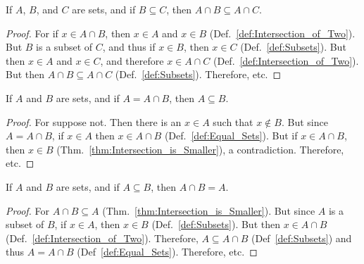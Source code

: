 \documentclass[crop=false,class=book,oneside]{standalone}
\begin{document}
            \begin{theorem}
                \label{thm:Intersection_with_Lesser_Set}%
                If $A$, $B$, and $C$ are sets, and if
                $B\subseteq{C}$, then
                $A\cap{B}\subseteq{A}\cap{C}$.
            \end{theorem}
            \begin{proof}
                For if $x\in{A}\cap{B}$, then $x\in{A}$ and
                $x\in{B}$ (Def.~\ref{def:Intersection_of_Two}).
                But $B$ is a subset of $C$, and thus if
                $x\in{B}$, then $x\in{C}$
                (Def.~\ref{def:Subsets}). But then $x\in{A}$ and
                $x\in{C}$, and therefore $x\in{A}\cap{C}$
                (Def.~\ref{def:Intersection_of_Two}). But
                then $A\cap{B}\subseteq{A}\cap{C}$
                (Def.~\ref{def:Subsets}). Therefore, etc.
            \end{proof}
            \begin{theorem}
                \label{thm:Intersection_is_Equal}%
                If $A$ and $B$ are sets, and if
                $A=A\cap{B}$, then $A\subseteq{B}$.
            \end{theorem}
            \begin{proof}
                For suppose not. Then there is an $x\in{A}$ such
                that $x\notin{B}$. But since $A=A\cap{B}$,
                if $x\in{A}$ then $x\in{A}\cap{B}$
                (Def.~\ref{def:Equal_Sets}). But if
                $x\in{A}\cap{B}$, then $x\in{B}$
                (Thm.~\ref{thm:Intersection_is_Smaller}),
                a contradiction. Therefore, etc.
            \end{proof}
            \begin{theorem}
                \label{thm:Intersection_of_Subset}%
                If $A$ and $B$ are sets, and if
                $A\subseteq{B}$, then $A\cap{B}=A$.
            \end{theorem}
            \begin{proof}
                For $A\cap{B}\subseteq{A}$
                (Thm.~\ref{thm:Intersection_is_Smaller}). But
                since $A$ is a subset of $B$, if $x\in{A}$, then
                $x\in{B}$ (Def.~\ref{def:Subsets}). But then
                $x\in{A}\cap{B}$
                (Def.~\ref{def:Intersection_of_Two}). Therefore,
                $A\subseteq{A}\cap{B}$ (Def~\ref{def:Subsets})
                and thus $A=A\cap{B}$ (Def~\ref{def:Equal_Sets}).
                Therefore, etc.
            \end{proof}
\end{document}
